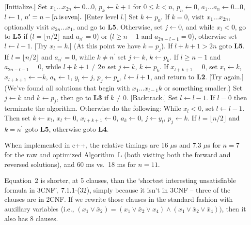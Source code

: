  [Initialize.] Set $x_1 \ldots x_{2 n} \leftarrow 0 
\ldots 0$, $p_k \leftarrow k + 1$ for $0 \leq k < n$, $p_n \leftarrow 0$, 
$a_{1} \ldots a_{n} \leftarrow 0 \ldots 0$, $l \leftarrow 1$,
$n^{\prime} = n - [n \rm{\, is\, even}].$
\vskip 0.05in
 [Enter level $l$.] Set $k \gets p_0$.  If $k = 0$, visit
$x_1 \ldots x_{2n}$, optionally visit $x_{2n} \ldots x_1$, and 
go to {\bf L5}.  Otherwise, set $j \leftarrow 0$, and
while $x_l < 0$, go to {\bf L5} if ($l = \lfloor n / 2 \rfloor$ and 
$a_{n^{\prime}} = 0$) or ($l \ge n - 1$ and $a_{2n - l - 1} = 0$), otherwise
set $l \leftarrow l + 1$.
\vskip 0.05in
 [Try $x_l = k$.] (At this point we have $k = p_j$).  
If $l + k + 1 > 2n$ goto {\bf L5}.  If $l = \lfloor n / 2 \rfloor$ and 
$a_{n^{\prime}} = 0$, while $k \ne n^{\prime}$ set $j \leftarrow k$, 
$k \leftarrow p_k$.  If $l \ge n - 1$ and $a_{2n - l - 1} = 0$, while 
$l + k + 1 \ne 2 n $ set $j \leftarrow k$, $k \leftarrow p_k$.  If 
$x_{l + k + 1} = 0$, set $x_l \leftarrow k$, $x_{l + k + 1} \leftarrow - k$,
$a_k \leftarrow 1$, $y_l \leftarrow j$, $p_j \leftarrow p_k$, 
$l \leftarrow l + 1$, and return to {\bf L2}.
\vskip 0.05in
 [Try again.] (We've found all solutions that begin with 
$x_1 \ldots x_{l-1} k$ or something smaller.) Set $j \leftarrow k$ and 
$k \leftarrow p_j$, then go to {\bf L3} if $k \ne 0$.
\vskip 0.05in
 [Backtrack.] Set $l \leftarrow l - 1$.   If $l = 0$ then 
terminate the algorithm. Otherwise do the following: While $x_l < 0$, set 
$l \leftarrow l - 1$.  Then set $k \leftarrow x_l$, $x_l \leftarrow 0$, 
$x_{l + k + 1} \leftarrow 0$, $a_k \leftarrow 0$, $j \leftarrow y_l$, 
$p_j \leftarrow k$.  If $l = \lfloor n / 2 \rfloor$ and $k = n^{\prime}$
goto {\bf L5}, otherwise goto {\bf L4}.
\vskip 0.1in

\noindent When implemented in c++, the relative timings are 16 $\mu$s and 7.3 $\mu$s 
for $n = 7$ for the raw and optimized Algorithm~L (both visiting both the 
forward and reversed solutions), and 60 ms vs.\ 18 ms for $n = 11$.



 Equation~2 is shorter, at 5 clauses, than the `shortest
interesting unsatisfiable formula in 3CNF', 7.1.1-(32), simply because it isn't
in 3CNF -- three of the clauses are in 2CNF.  If we rewrite those clauses in 
the standard fashion with auxillary variables (i.e., $\left(x_1 \vee {\bar x}_2 \right) =
\left(x_1 \vee {\bar x}_2 \vee x_4\right) \wedge \left(x_1 \vee {\bar x}_2 \vee {\bar x}_4\right))$,
then it also has 8 clauses.


